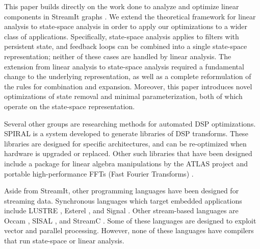 \label{sec:related}

This paper builds directly on the work done to analyze and optimize
linear components in StreamIt graphs \cite{Lamb}. We extend the
theoretical framework for linear analysis to state-space analysis in
order to apply our optimizations to a wider class of applications.
Specifically, state-space analysis applies to filters with persistent
state, and feedback loops can be combined into a single state-space
representation; neither of these cases are handled by linear analysis.
The extension from linear analysis to state-space analysis required a
fundamental change to the underlying representation, as well as a
complete reformulation of the rules for combination and expansion.
Moreover, this paper introduces novel optimizations of state removal
and minimal parameterization, both of which operate on the state-space
representation.

Several other groups are researching methods for automated DSP
optimizations. SPIRAL \cite{Spiral} is a system developed to generate
libraries of DSP transforms. These libraries are designed for specific
architectures, and can be re-optimized when hardware is upgraded or
replaced. Other such libraries that have been designed include a
package for linear algebra manipulations by the ATLAS project
\cite{Atlas} and portable high-performance FFTs (Fast Fourier
Transforms) \cite{fftw}.

Aside from StreamIt, other programming languages have been designed
for streaming data. Synchronous languages which target embedded
applications include LUSTRE \cite{Lustre}, Esterel \cite{Esterel}, and
Signal \cite{Signal}. Other stream-based languages are Occam
\cite{Occam}, SISAL \cite{sisal}, and StreamC \cite{streamc}.  Some of
these languages are designed to exploit vector and parallel
processing. However, none of these languages have compilers that run
state-space or linear analysis.
